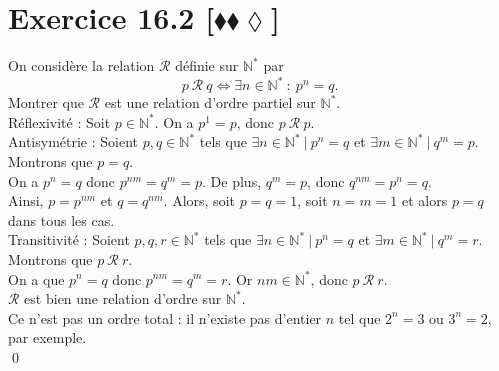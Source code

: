 \documentclass[10pt]{article}
\begin{document}
\section*{Exercice 16.2 [$\blacklozenge\blacklozenge\lozenge$]}
\begin{tcolorbox}[enhanced, width=7.6in, center, size=fbox, fontupper=\large, drop shadow southwest]
    On considère la relation $\mathcal{R}$ définie sur $\mathbb{N}^*$ par
    \begin{equation*}
        p ~ \mathcal{R} ~ q \iff \exists n \in \mathbb{N}^* ~ : ~ p^n = q.
    \end{equation*}
    Montrer que $\mathcal{R}$ est une relation d'ordre partiel sur $\mathbb{N}^*$.\\[0.15cm]
    Réflexivité : Soit $p \in \mathbb{N}^*$. On a $p^1=p$, donc $p ~ \mathcal{R} ~ p$.\\[0.1cm]
    Antisymétrie : Soient $p,q\in\mathbb{N}^*$ tels que $\exists n \in \mathbb{N}^* ~ | ~ p^n = q$ et $\exists m \in \mathbb{N}^* ~ | ~ q^m = p$. Montrons que $p=q$.\\
    On a $p^n = q$ donc $p^{nm} = q^m = p$. De plus, $q^m = p$, donc $q^{nm} = p^n = q$.\\
    Ainsi, $p = p^{nm}$ et $q=q^{nm}$. Alors, soit $p = q = 1$, soit $n=m=1$ et alors $p=q$ dans tous les cas.\\[0.1cm]
    Transitivité : Soient $p,q,r \in \mathbb{N}^*$ tels que $\exists n \in \mathbb{N}^* ~ | ~ p^n = q$ et $\exists m \in \mathbb{N}^* ~ | ~ q^m = r$. Montrons que $p ~ \mathcal{R} ~ r$.\\
    On a que $p^{n} = q$ donc $p^{nm}=q^m=r$. Or $nm \in \mathbb{N}^*$, donc $p ~ \mathcal{R} ~ r$.\\[0.2cm]
    $\mathcal{R}$ est bien une relation d'ordre sur $\mathbb{N}^*$.\\
    Ce n'est pas un ordre total : il n'existe pas d'entier $n$ tel que $2^n=3$ ou $3^n=2$, par exemple.\\
    \qed
\end{tcolorbox}
\end{document}
